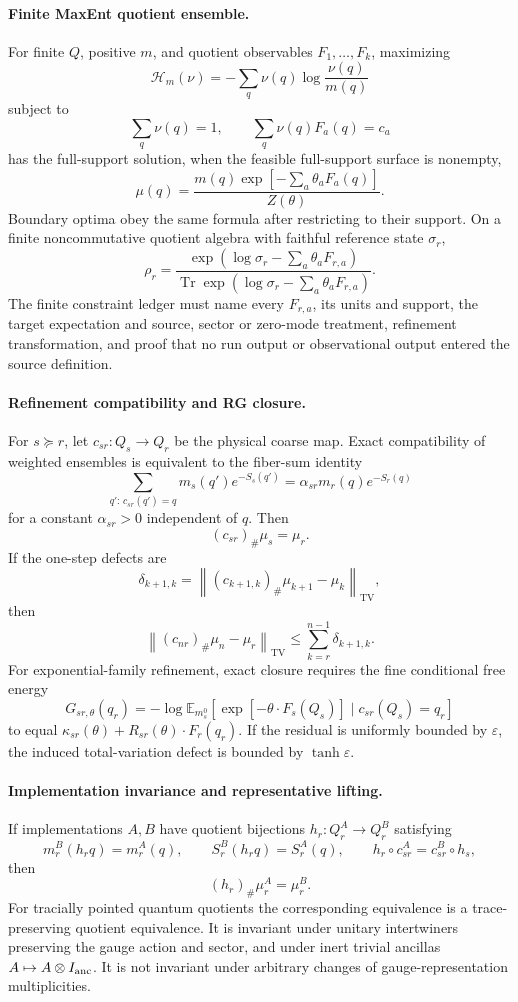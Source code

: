 \paragraph{Finite MaxEnt quotient ensemble.}
For finite \(Q\), positive \(m\), and quotient observables \(F_1,\ldots,F_k\), maximizing
\[
\mathcal H_m(\nu)=-\sum_q\nu(q)\log\frac{\nu(q)}{m(q)}
\]
subject to
\[
\sum_q\nu(q)=1,\qquad \sum_q\nu(q)F_a(q)=c_a
\]
has the full-support solution, when the feasible full-support surface is nonempty,
\[
\mu(q)=
\frac{m(q)\exp[-\sum_a\theta_aF_a(q)]}{Z(\theta)}.
\]
Boundary optima obey the same formula after restricting to their support.  On a finite
noncommutative quotient algebra with faithful reference state \(\sigma_r\),
\[
\rho_r=
\frac{\exp(\log\sigma_r-\sum_a\theta_aF_{r,a})}
{\operatorname{Tr}\exp(\log\sigma_r-\sum_a\theta_aF_{r,a})}.
\]
The finite constraint ledger must name every \(F_{r,a}\), its units and support, the target
expectation and source, sector or zero-mode treatment, refinement transformation, and proof that no
run output or observational output entered the source definition.

\paragraph{Refinement compatibility and RG closure.}
For \(s\succeq r\), let \(c_{sr}:Q_s\to Q_r\) be the physical coarse map.  Exact compatibility of
weighted ensembles is equivalent to the fiber-sum identity
\[
\sum_{q':\,c_{sr}(q')=q}m_s(q')e^{-S_s(q')}
=
\alpha_{sr}m_r(q)e^{-S_r(q)}
\]
for a constant \(\alpha_{sr}>0\) independent of \(q\).  Then
\[
(c_{sr})_\#\mu_s=\mu_r.
\]
If the one-step defects are
\[
\delta_{k+1,k}
=
\left\|(c_{k+1,k})_\#\mu_{k+1}-\mu_k\right\|_{\mathrm{TV}},
\]
then
\[
\left\|(c_{nr})_\#\mu_n-\mu_r\right\|_{\mathrm{TV}}
\le
\sum_{k=r}^{n-1}\delta_{k+1,k}.
\]
For exponential-family refinement, exact closure requires the fine conditional free energy
\[
G_{sr,\theta}(q_r)
=
-\log\mathbb E_{m_s^0}\left[
\exp[-\theta\cdot F_s(Q_s)]\mid c_{sr}(Q_s)=q_r
\right]
\]
to equal \(\kappa_{sr}(\theta)+R_{sr}(\theta)\cdot F_r(q_r)\).  If the residual is uniformly
bounded by \(\varepsilon\), the induced total-variation defect is bounded by \(\tanh\varepsilon\).

\paragraph{Implementation invariance and representative lifting.}
If implementations \(A,B\) have quotient bijections \(h_r:Q_r^A\to Q_r^B\) satisfying
\[
m_r^B(h_rq)=m_r^A(q),\qquad
S_r^B(h_rq)=S_r^A(q),
\qquad
h_r\circ c_{sr}^A=c_{sr}^B\circ h_s,
\]
then
\[
(h_r)_\#\mu_r^A=\mu_r^B.
\]
For tracially pointed quantum quotients the corresponding equivalence is a trace-preserving
quotient equivalence.  It is invariant under unitary intertwiners preserving the gauge action and
sector, and under inert trivial ancillas \(A\mapsto A\otimes I_{\rm anc}\).  It is not invariant
under arbitrary changes of gauge-representation multiplicities.

